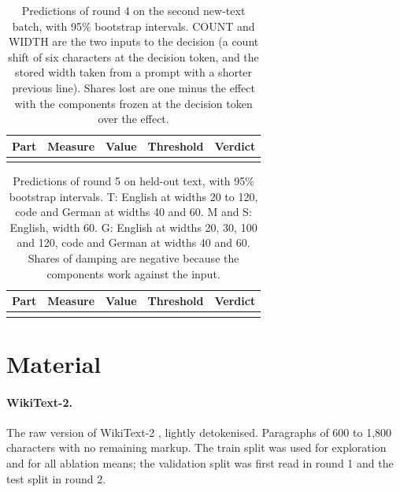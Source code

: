 \documentclass[11pt,a4paper]{article}
\begin{document}
\begin{table}[!tp]
\centering\scriptsize
\caption{Predictions of round 4 on the second new-text batch, with 95\% bootstrap intervals. COUNT and WIDTH are the two inputs to the decision (a count shift of six characters at the decision token, and the stored width taken from a prompt with a shorter previous line). Shares lost are one minus the effect with the components frozen at the decision token over the effect.}
\label{tab:round4}
\begin{tabularx}{\textwidth}{@{}l L P{2.7cm} P{2.9cm} l@{}}
\toprule
Part & Measure & Value & Threshold & Verdict \\
\midrule
{}
\bottomrule
\end{tabularx}
\end{table}

\begin{table}[!tp]
\centering\scriptsize
\caption{Predictions of round 5 on held-out text, with 95\% bootstrap intervals. T: English at widths 20 to 120, code and German at widths 40 and 60. M and S: English, width 60. G: English at widths 20, 30, 100 and 120, code and German at widths 40 and 60. Shares of damping are negative because the components work against the input.}
\label{tab:round5}
\begin{tabularx}{\textwidth}{@{}l L P{3.6cm} P{3.0cm} l@{}}
\toprule
Part & Measure & Value & Threshold & Verdict \\
\midrule
{}
\bottomrule
\end{tabularx}
\end{table}

\FloatBarrier
\section{Material}
\label{app:material}

\paragraph{WikiText-2.}
The raw version of WikiText-2 \citep{merity2017pointer}, lightly detokenised. Paragraphs of 600 to 1,800 characters with no remaining markup. The train split was used for exploration and for all ablation means; the validation split was first read in round 1 and the test split in round 2.
\end{document}
